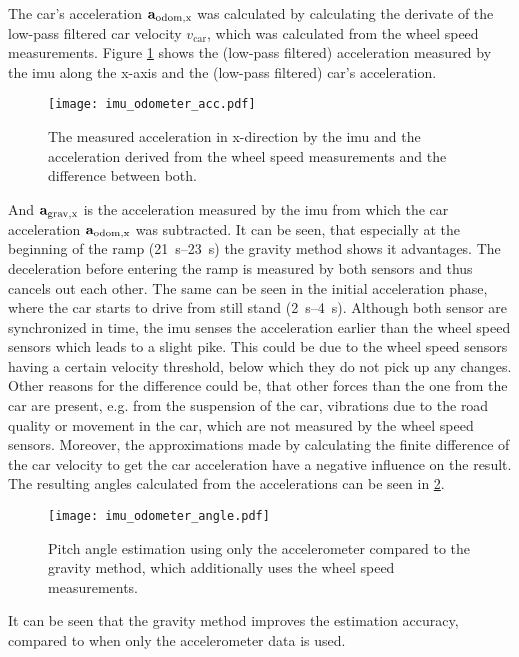 The car's acceleration $\vb{a}_\mathrm{odom,x} $ was calculated by calculating the derivate of the low-pass filtered car velocity $v_\mathrm{car} $, which was calculated from the wheel speed measurements.
Figure \ref{fig:imu_odometer_acc} shows the (low-pass filtered) acceleration measured by the \gls{imu} along the x-axis and the (low-pass filtered) car's acceleration.
\begin{figure}[htb]
	\centering
	\texttt{[image: imu\_odometer\_acc.pdf]}
	\caption[Acceleration from  and odometer]{The measured acceleration in x-direction by the \gls{imu} and the acceleration derived from the wheel speed measurements and the difference between both.}
	\label{fig:imu_odometer_acc}
\end{figure}
And $\vb{a}_\mathrm{grav,x} $ is the acceleration measured by the \gls{imu} from which the car acceleration $\vb{a}_\mathrm{odom,x} $ was subtracted.
It can be seen, that especially at the beginning of the ramp (\SIrange{21}{23}{\second}) the gravity method shows it advantages.
The deceleration before entering the ramp is measured by both sensors and thus cancels out each other.
The same can be seen in the initial acceleration phase, where the car starts to drive from still stand (\SIrange[]{2}{4}{\second}).
Although both sensor are synchronized in time, the \gls{imu} senses the acceleration earlier than the wheel speed sensors which leads to a slight pike.
This could be due to the wheel speed sensors having a certain velocity threshold, below which they do not pick up any changes.
Other reasons for the difference could be, that other forces than the one from the car are present, e.g. from the suspension of the car, vibrations due to the road quality or movement in the car, which are not measured by the wheel speed sensors.
Moreover, the approximations made by calculating the finite difference of the car velocity to get the car acceleration have a negative influence on the result.\\
The resulting angles calculated from the accelerations can be seen in \cref{fig:imu_odometer_angle}.
\begin{figure}[htb]
	\centering
	\texttt{[image: imu\_odometer\_angle.pdf]}
	\caption[Angle estimation using the gravity method]{Pitch angle estimation using only the accelerometer compared to the gravity method, which additionally uses the wheel speed measurements.}
	\label{fig:imu_odometer_angle}
\end{figure}
It can be seen that the gravity method improves the estimation accuracy, compared to when only the accelerometer data is used.
